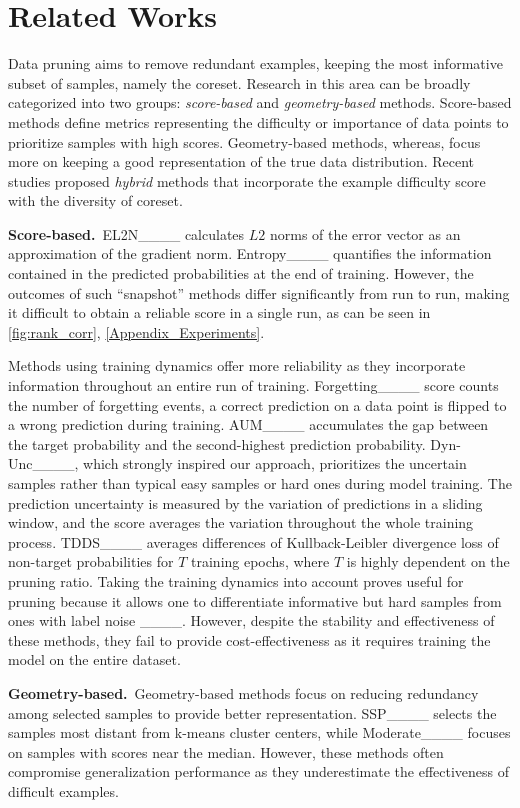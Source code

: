 \section{Related Works}
Data pruning aims to remove redundant examples, keeping the most informative subset of samples, namely the coreset.
Research in this area can be broadly categorized into two groups: \textit{score-based} and \textit{geometry-based} methods. Score-based methods define metrics representing the difficulty or importance of data points to prioritize samples with high scores. Geometry-based methods, whereas, focus more on keeping a good representation of the true data distribution.
Recent studies proposed \textit{hybrid} methods that incorporate the example difficulty score with the diversity of coreset.

\noindent\textbf{Score-based.}~EL2N____ calculates $L2$ norms of the error vector as an approximation of the gradient norm.
Entropy____ quantifies the information contained in the predicted probabilities at the end of training. However, the outcomes of such ``snapshot'' methods differ significantly from run to run, making it difficult to obtain a reliable score in a single run, as can be seen in \cref{fig:rank_corr}, \cref{Appendix_Experiments}.

Methods using training dynamics offer more reliability as they incorporate information throughout an entire run of training. Forgetting____ score counts the number of forgetting events, a correct prediction on a data point is flipped to a wrong prediction during training. AUM____ accumulates the gap between the target probability and the second-highest prediction probability. 
Dyn-Unc____, which strongly inspired our approach, prioritizes the uncertain samples rather than typical easy samples or hard ones during model training. The prediction uncertainty is measured by the variation of predictions in a sliding window, and the score averages the variation throughout the whole training process.
TDDS____ averages differences of Kullback-Leibler divergence loss of non-target probabilities for $T$ training epochs, where $T$ is highly dependent on the pruning ratio.
Taking the training dynamics into account proves useful for pruning because it allows one to differentiate informative but hard samples from ones with label noise ____. However, despite the stability and effectiveness of these methods, they fail to provide cost-effectiveness as it requires training the model on the entire dataset.

\noindent\textbf{Geometry-based.}~Geometry-based methods focus on reducing redundancy among selected samples to provide better representation. 
SSP____ selects the samples most distant from k-means cluster centers, while Moderate____ focuses on samples with scores near the median.
However, these methods often compromise generalization performance as they underestimate the effectiveness of difficult examples.

